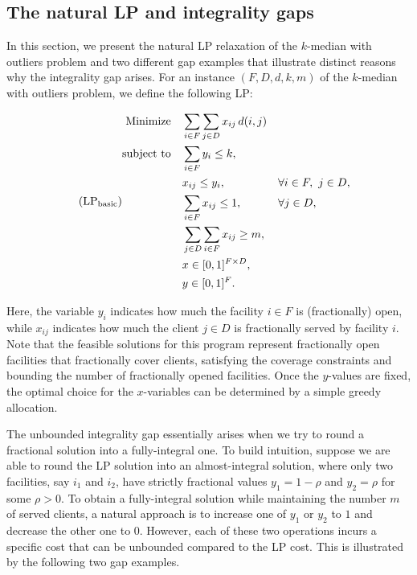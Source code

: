 \subsection{The natural LP and integrality gaps}
In this section, we present the natural LP relaxation of the $k$-median with outliers problem and two different gap examples that illustrate distinct reasons why the integrality gap arises. For an instance $(F,D,d,k,m)$ of the $k$-median with outliers problem, we define the following LP:

\begin{equation}\tag{$\text{LP}_{\text{basic}}$} \label{LP-basic} 
\begin{aligned} 
\text{Minimize} \quad &\sum_{i \in F} \sum_{j \in D} x_{ij} \,d(i,j) \\
\text{subject to} \quad &\sum_{i \in F} y_i \le k, \\ 
&x_{ij} \le y_i, && \forall i \in F, \ j \in D,\\ 
&\sum_{i \in F} x_{ij} \le 1, && \forall j \in D,\\ 
&\sum_{j \in D} \sum_{i \in F} x_{ij} \ge m, \\ 
&x \in[0,1]^{F\times D}, \\
&y \in [0,1]^F.
\end{aligned} 
\end{equation}

Here, the variable $y_i$ indicates how much the facility $i \in F$ is (fractionally) open, while $x_{ij}$ indicates how much the client $j \in D$ is fractionally served by facility $i$. Note that the feasible solutions for this program represent fractionally open facilities that fractionally cover clients, satisfying the coverage constraints and bounding the number of fractionally opened facilities. Once the $y$-values are fixed, the optimal choice for the $x$-variables can be determined by a simple greedy allocation.

The unbounded integrality gap essentially arises when we try to round a fractional solution into a fully-integral one. To build intuition, suppose we are able to round the LP solution into an almost-integral solution, where only two facilities, say $i_1$ and $i_2$, have strictly fractional values $y_1 = 1-\rho$ and $y_2 = \rho$ for some $\rho > 0$. To obtain a fully-integral solution while maintaining the number $m$ of served clients, a natural approach is to increase one of $y_1$ or $y_2$ to $1$ and decrease the other one to $0$. However, each of these two operations incurs a specific cost that can be unbounded compared to the LP cost. This is illustrated by the following two gap examples.

